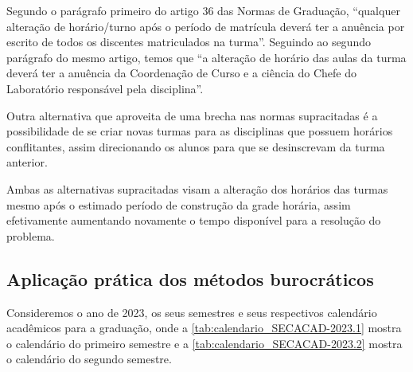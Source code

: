 Segundo o parágrafo primeiro do artigo 36 das Normas de Graduação, ``qualquer alteração de horário/turno após o período de matrícula deverá ter a anuência por escrito de todos os discentes matriculados na turma''. Seguindo ao segundo parágrafo do mesmo artigo, temos que ``a alteração de horário das aulas da turma deverá ter a anuência da Coordenação de Curso e a ciência do Chefe do Laboratório responsável pela disciplina''.

Outra alternativa que aproveita de uma brecha nas normas supracitadas é a possibilidade de se criar novas turmas para as disciplinas que possuem horários conflitantes, assim direcionando os alunos para que se desinscrevam da turma anterior.

Ambas as alternativas supracitadas visam a alteração dos horários das turmas mesmo após o estimado período de construção da grade horária, assim efetivamente aumentando novamente o tempo disponível para a resolução do problema.


\subsection{Aplicação prática dos métodos burocráticos} %



Consideremos o ano de 2023, os seus semestres e seus respectivos calendário acadêmicos para a graduação, onde a \autoref{tab:calendario_SECACAD-2023.1} mostra o calendário do primeiro semestre e a \autoref{tab:calendario_SECACAD-2023.2} mostra o calendário do segundo semestre.

